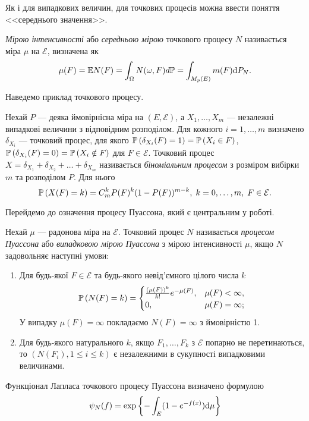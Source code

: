 Як і для випадкових величин, для
точкових процесів можна ввести поняття <<середнього значення>>.
\begin{definition}
    \emph{Мірою інтенсивності} або \emph{середньою мірою} точкового процесу $N$
    називається міра $\mu$ на $\mathcal{E}$, визначена як
    $$
        \mu(F) = \E N(F) = \int_{\Omega} N(\omega, F) d\mathbb{P} = 
        \int_{M_p(E)} m(F) \d P_N.
    $$
\end{definition}

Наведемо приклад точкового процесу.
\begin{definition}
    Нехай $P$ --- деяка ймовірнісна міра на $\left(E, \mathcal{E}\right)$, а
    $X_1, \dots, X_m$ --- незалежні випадкові величини з відповідним розподілом.
    Для кожного $i = 1, \dots, m$ визначено $\delta_{X_i}$ --- точковий процес,
    для якого $\P{\delta_{X_i}(F) = 1} = \P{X_i \in F}$,
    $\P{\delta_{X_i}(F) = 0} = \P{X_i \notin F}$ для $F \in \mathcal{E}$.
    Точковий процес $X = \delta_{X_1} + \delta_{X_2} + \dots + \delta_{X_m}$
    називається \emph{біноміальним процесом}
    з розміром вибірки $m$ та розподілом $P$. Для нього
    $$
        \P{X(F) = k} = C_m^k P(F)^k (1 - P(F))^{m-k}, \; k = 0,\dots,m, \; F \in \mathcal{E}.
    $$
\end{definition}

Перейдемо до означення процесу Пуассона, який є центральним у роботі.
\begin{definition}\label{def:poiss_proc}
    Нехай $\mu$ --- радонова міра на $\mathcal{E}$.
    Точковий процес $N$ називається \emph{процесом Пуассона} або
    \emph{випадковою мірою Пуассона} з мірою інтенсивності $\mu$, якщо $N$ 
    задовольняє наступні умови:
    \begin{enumerate}
        \item Для будь-якої $F \in \mathcal{E}$ 
        та будь-якого невід'ємного цілого числа $k$
        \begin{gather*}
            \P{N(F) = k} = \begin{cases}
                \frac{(\mu(F))^k}{k!} e^{-\mu(F)}, & \mu(F) < \infty, \\
                0, & \mu(F) = \infty;
            \end{cases}
        \end{gather*}
        У випадку $\mu(F) = \infty$ покладаємо $N(F) = \infty$ з ймовірністю 1.
        \item Для будь-якого натурального $k$, 
        якщо $F_1, \dots, F_k$ з $\mathcal{E}$ попарно не перетинаються, то
        $\left(N(F_i), 1\leq i \leq k\right)$ є незалежними в сукупності випадковими величинами.
    \end{enumerate}
    Функціонал Лапласа точкового процесу Пуассона визначено формулою
    \begin{gather}
        \psi_N(f) = \exp\left\{ 
            - \int_E (1 - e^{-f(x)}) \d \mu
        \right\}
    \end{gather}
\end{definition}

